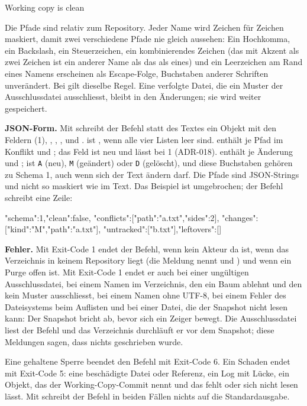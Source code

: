 \starttyping
Working copy is clean
\stoptyping

Die Pfade sind relativ zum Repository.
Jeder Name wird Zeichen für Zeichen maskiert, damit zwei verschiedene Pfade nie gleich aussehen:
Ein Hochkomma, ein Backslash, ein Steuerzeichen, ein kombinierendes Zeichen
(das  mit Akzent als zwei Zeichen ist ein anderer Name als das  als eines)
und ein Leerzeichen am Rand eines Namens erscheinen als Escape-Folge,
Buchstaben anderer Schriften unverändert.
Bei  gilt dieselbe Regel.
Eine verfolgte Datei, die ein Muster der Ausschlussdatei ausschliesst, bleibt in den
Änderungen; sie wird weiter gespeichert.

{\bf JSON-Form.} Mit  schreibt der Befehl statt des Textes ein Objekt mit den Feldern
 (1), , , ,  und
.  ist , wenn alle vier Listen leer sind.
 enthält je Pfad im Konflikt  und ; das Feld ist
neu und lässt  bei 1 (ADR-018).
 enthält je Änderung  und ;  ist {\tt A}
(neu), {\tt M} (geändert) oder {\tt D} (gelöscht), und diese Buchstaben gehören zu Schema 1,
auch wenn sich der Text ändern darf.
Die Pfade sind JSON-Strings und nicht so maskiert wie im Text.
Das Beispiel ist umgebrochen; der Befehl schreibt eine Zeile:

\starttyping
{"schema":1,"clean":false,
"conflicts":[{"path":"a.txt","sides":2}],
"changes":[{"kind":"M","path":"a.txt"}],
"untracked":["b.txt"],"leftovers":[]}
\stoptyping

{\bf Fehler.} Mit Exit-Code 1 endet der Befehl, wenn kein Akteur da ist,
wenn das Verzeichnis in keinem Repository liegt (die Meldung nennt  und
)
und wenn ein Purge offen ist.
Mit Exit-Code 1 endet er auch bei einer ungültigen Ausschlussdatei,
bei einem Namen im Verzeichnis, den ein Baum ablehnt und den kein Muster ausschliesst,
bei einem Namen ohne UTF-8, bei einem Fehler des Dateisystems beim Auflisten
und bei einer Datei, die der Snapshot nicht lesen kann: Der Snapshot bricht ab,
bevor sich ein Zeiger bewegt.
Die Ausschlussdatei liest der Befehl und das Verzeichnis durchläuft er vor dem Snapshot;
diese Meldungen sagen, dass nichts geschrieben wurde.

Eine gehaltene Sperre beendet den Befehl mit Exit-Code 6.
Ein Schaden endet mit Exit-Code 5: eine beschädigte Datei  oder Referenz,
ein Log mit Lücke, ein Objekt, das der Working-Copy-Commit nennt und das fehlt oder sich nicht
lesen lässt.
Mit  schreibt der Befehl in beiden Fällen nichts auf die Standardausgabe.

